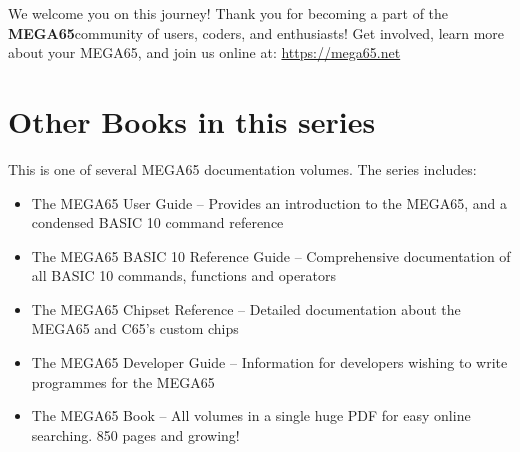 We welcome you on this journey! Thank you for becoming a part of the {\bf MEGA65}community of users, coders, and enthusiasts! Get involved, learn more about your MEGA65, and join us online at: \url{https://mega65.net}


\section{Other Books in this series}

This is one of several MEGA65 documentation volumes.  The series includes:

\begin{itemize}
	\item The MEGA65 User Guide -- Provides an introduction to the MEGA65, and a condensed BASIC 10 command reference
	\item The MEGA65 BASIC 10 Reference Guide -- Comprehensive documentation of all BASIC 10 commands, functions and operators
	\item The MEGA65 Chipset Reference -- Detailed documentation about the MEGA65 and C65's custom chips
	\item The MEGA65 Developer Guide -- Information for developers wishing to write programmes for the MEGA65
	\item The MEGA65 Book -- All volumes in a single huge PDF for easy online searching. 850 pages and growing!
\end{itemize}
